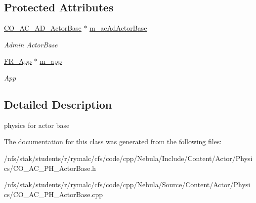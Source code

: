 \subsection*{Protected Attributes}
\begin{DoxyCompactItemize}
\item 
\hypertarget{classContent_1_1Actor_1_1Physics_1_1ActorBase_acb1f1be615b6ead592fc7e53578a781f}{
\hyperlink{classContent_1_1Actor_1_1Admin_1_1ActorBase}{CO\_\-AC\_\-AD\_\-ActorBase} $\ast$ \hyperlink{classContent_1_1Actor_1_1Physics_1_1ActorBase_acb1f1be615b6ead592fc7e53578a781f}{m\_\-acAdActorBase}}
\label{classContent_1_1Actor_1_1Physics_1_1ActorBase_acb1f1be615b6ead592fc7e53578a781f}

\begin{DoxyCompactList}\small\item\em Admin ActorBase \item\end{DoxyCompactList}\item 
\hypertarget{classContent_1_1Actor_1_1Physics_1_1ActorBase_a146de12d1dfc9f28e63830f40ee3851e}{
\hyperlink{classFramework_1_1App}{FR\_\-App} $\ast$ \hyperlink{classContent_1_1Actor_1_1Physics_1_1ActorBase_a146de12d1dfc9f28e63830f40ee3851e}{m\_\-app}}
\label{classContent_1_1Actor_1_1Physics_1_1ActorBase_a146de12d1dfc9f28e63830f40ee3851e}

\begin{DoxyCompactList}\small\item\em App \item\end{DoxyCompactList}\end{DoxyCompactItemize}


\subsection{Detailed Description}
physics for actor base 

The documentation for this class was generated from the following files:\begin{DoxyCompactItemize}
\item 
/nfs/stak/students/r/rymalc/cfs/code/cpp/Nebula/Include/Content/Actor/Physics/CO\_\-AC\_\-PH\_\-ActorBase.h\item 
/nfs/stak/students/r/rymalc/cfs/code/cpp/Nebula/Source/Content/Actor/Physics/CO\_\-AC\_\-PH\_\-ActorBase.cpp\end{DoxyCompactItemize}
